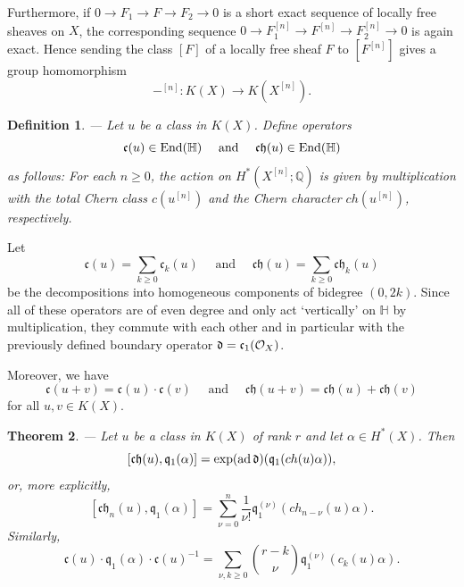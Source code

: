 \documentclass[twoside,11pt]{article}
\newtheorem{theorem}{Theorem}[section]
\newtheorem{definition}[theorem]{Definition}
\newcommand{\ko}{{\cal O}}
\newcommand{\IH}{{\mathbb H}}
\newcommand{\IQ}{{\mathbb Q}}
\newcommand{\gothc}{{\mathfrak c}}
\newcommand{\gothd}{{\mathfrak d}}
\newcommand{\gothh}{{\mathfrak h}}
\newcommand{\gothq}{{\mathfrak q}}
\newcommand{\End}{{\rm End}}
\newcommand{\cc}{\gothc}
\newcommand{\dd}{\gothd}
\newcommand{\qq}{\gothq}
\newcommand{\ch}{{\gothc\gothh}}
\newcommand{\ad}{{\rm ad\,}}
\newcommand{\lra}{\longrightarrow}
\newcommand{\ses}[3]{0\rightarrow#1\rightarrow#2
   \rightarrow#3\rightarrow0}
\begin{document}
Furthermore, if $\ses{F_1}{F}{F_2}$ is a short exact sequence of locally free
sheaves on $X$, the corresponding sequence
$\ses{F_1^{[n]}}{F^{[n]}}{F_2^{[n]}}$ is again exact. 
Hence sending the class $[F]$ of a locally free sheaf $F$ to $[F^{[n]}]$
gives a group homomorphism
$$-^{[n]}:K(X)\lra K(X^{[n]}).$$

\begin{definition}--- Let $u$ be a class in $K(X)$. Define operators
$$\cc(u)\in \End(\IH)\quad\mbox{ and }\quad\ch(u)\in \End(\IH)$$
as follows: For each $n\geq0$, the action on $H^*(X^{[n]};\IQ)$ is given by 
multiplication with the total Chern class $c(u^{[n]})$ and the 
Chern character $ch(u^{[n]})$, respectively. 
\end{definition}

Let
$$\cc(u)=\sum_{k\geq0}\cc_k(u)\quad\mbox{ and }\quad\ch(u)=
\sum_{k\geq 0}\ch_k(u)$$
be the decompositions into homogeneous components of bidegree $(0,2k)$.
Since all of these operators are of even degree and only act `vertically'
on $\IH$ by multiplication, they commute with each other and in particular 
with the previously defined boundary operator $\dd=\cc_1(\ko_X)$.

Moreover, we have
$$\cc(u+v)=\cc(u)\cdot\cc(v)\quad\mbox{ and }\quad\ch(u+v)=\ch(u)+\ch(v)$$
for all $u,v\in K(X)$.


\begin{theorem}\label{cqcommutator}--- Let $u$ be a class in $K(X)$
of rank $r$ and let $\alpha\in H^*(X)$. Then
$$[\ch(u),\qq_1(\alpha)]=\exp(\ad\dd)(\qq_1(ch(u)\alpha)),$$
or, more explicitly,
$$[\ch_n(u),\qq_1(\alpha)]=\sum_{\nu=0}^n\frac{1}{\nu!}\qq_1^{(\nu)}
(ch_{n-\nu}(u)\alpha).$$
Similarly,
$$\cc(u)\cdot\qq_1(\alpha)\cdot\cc(u)^{-1}=\sum_{\nu,k\geq0}\binom{r-k}{\nu}\qq_1^{(\nu)}
(c_k(u)\alpha).$$
\end{theorem} 
\end{document}
